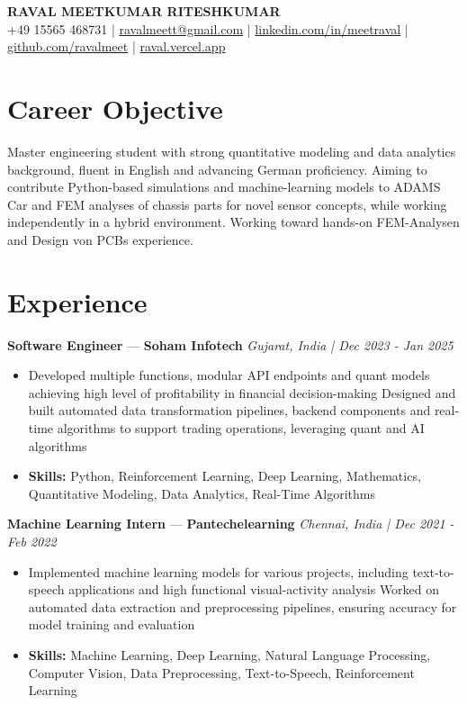 \documentclass[a4paper,10pt]{article}
\begin{document}
\begin{center}
  {\Large\bfseries RAVAL MEETKUMAR RITESHKUMAR}\\[2pt]
  {\small +49 15565 468731 \;|\; \href{mailto:ravalmeett@gmail.com}{ravalmeett@gmail.com} \;|\; \href{https://www.linkedin.com/in/meetraval/}{linkedin.com/in/meetraval} \;|\; \href{https://github.com/ravalmeet}{github.com/ravalmeet} \;|\; \href{https://raval.vercel.app/}{raval.vercel.app}}
\end{center}
\vspace{-3pt}

\section*{Career Objective}
Master engineering student with strong quantitative modeling and data analytics background, fluent in English and advancing German proficiency. Aiming to contribute Python-based simulations and machine-learning models to ADAMS Car and FEM analyses of chassis parts for novel sensor concepts, while working independently in a hybrid environment. Working toward hands-on FEM-Analysen and Design von PCBs experience.\par

\section*{Experience}
\textbf{Software Engineer} — \textbf{Soham Infotech} \hfill \textit{Gujarat, India \;|\; Dec 2023 - Jan 2025}\par
\vspace{1pt}
\begin{itemize}
  \item Developed multiple functions, modular API endpoints and quant models achieving high level of profitability in financial decision-making Designed and built automated data transformation pipelines, backend components and real-time algorithms to support trading operations, leveraging quant and AI algorithms
  \item \textbf{Skills:} Python, Reinforcement Learning, Deep Learning, Mathematics, Quantitative Modeling, Data Analytics, Real-Time Algorithms
\end{itemize}
\vspace{3pt}
\textbf{Machine Learning Intern} — \textbf{Pantechelearning} \hfill \textit{Chennai, India \;|\; Dec 2021 - Feb 2022}\par
\vspace{1pt}
\begin{itemize}
  \item Implemented machine learning models for various projects, including text-to-speech applications and high functional visual-activity analysis Worked on automated data extraction and preprocessing pipelines, ensuring accuracy for model training and evaluation
  \item \textbf{Skills:} Machine Learning, Deep Learning, Natural Language Processing, Computer Vision, Data Preprocessing, Text-to-Speech, Reinforcement Learning
\end{itemize}
\end{document}
